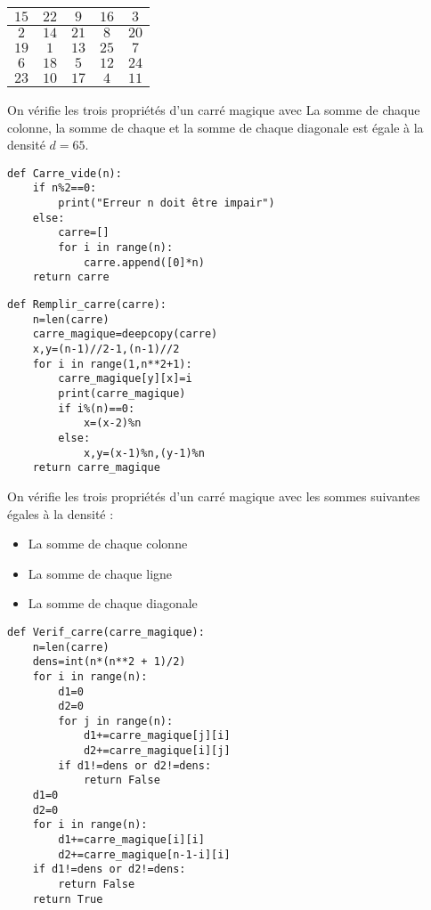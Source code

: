 \question{}

\renewcommand{\arraystretch}{1.2}
		\begin{tabular}{|*{5}{c|}}
			\hline
			$15$ & $22$ & $9$ & $16$ &$~3~$\\
			\hline
			$~2~$& $14$ & $21$ & $8$ & $20$ \\
			\hline
			 $19$  &$~1~$& $13$  & $25$  & $7$   \\
			\hline
			$~6~$& $18$ &$~5~$& $12$ & $24$ \\
			\hline
			 $23$ & $10$ & $17$ &$~4~$& $11$ \\
			\hline
		\end{tabular}
\renewcommand{\arraystretch}{1}

On vérifie les trois propriétés d'un carré magique avec La somme de chaque colonne, la somme de chaque et la somme de chaque diagonale est égale à la densité $d=65$.

\question{}

\begin{lstlisting}
def Carre_vide(n):
    if n%2==0:
        print("Erreur n doit être impair")
    else:
        carre=[]
        for i in range(n):
            carre.append([0]*n)
    return carre
\end{lstlisting}


\question{}

\begin{lstlisting}
def Remplir_carre(carre):
    n=len(carre)
    carre_magique=deepcopy(carre)
    x,y=(n-1)//2-1,(n-1)//2
    for i in range(1,n**2+1):
        carre_magique[y][x]=i
        print(carre_magique)
        if i%(n)==0:
            x=(x-2)%n
        else:
            x,y=(x-1)%n,(y-1)%n
    return carre_magique
\end{lstlisting}


\question{}

On vérifie les trois propriétés d'un carré magique avec les sommes suivantes égales à la densité :
\begin{itemize}
\item La somme de chaque colonne
\item La somme de chaque ligne
\item La somme de chaque diagonale
\end{itemize}

\begin{lstlisting}
def Verif_carre(carre_magique):
    n=len(carre)
    dens=int(n*(n**2 + 1)/2)
    for i in range(n):
        d1=0
        d2=0
        for j in range(n):
            d1+=carre_magique[j][i]
            d2+=carre_magique[i][j]
        if d1!=dens or d2!=dens:
            return False
    d1=0
    d2=0
    for i in range(n):
        d1+=carre_magique[i][i]
        d2+=carre_magique[n-1-i][i]
    if d1!=dens or d2!=dens:
        return False
    return True
\end{lstlisting}
